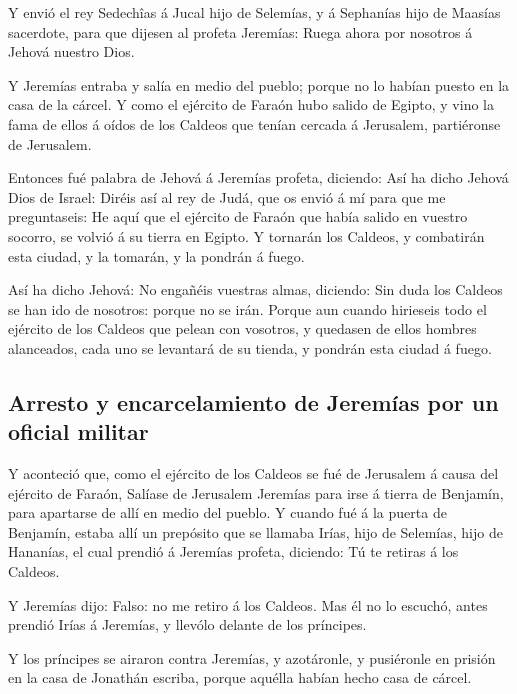  Y envió el rey Sedechîas á Jucal hijo de Selemías, y á
Sephanías hijo de Maasías sacerdote, para que dijesen al profeta
Jeremías: Ruega ahora por nosotros á Jehová nuestro Dios.

 Y Jeremías entraba y salía en medio del pueblo; porque no
lo habían puesto en la casa de la cárcel.  Y como el
ejército de Faraón hubo salido de Egipto, y vino la fama de ellos á
oídos de los Caldeos que tenían cercada á Jerusalem, partiéronse de
Jerusalem.

 Entonces fué palabra de Jehová á Jeremías profeta,
diciendo:  Así ha dicho Jehová Dios de Israel: Diréis así al
rey de Judá, que os envió á mí para que me preguntaseis: He aquí que el
ejército de Faraón que había salido en vuestro socorro, se volvió á su
tierra en Egipto.  Y tornarán los Caldeos, y combatirán esta
ciudad, y la tomarán, y la pondrán á fuego.

 Así ha dicho Jehová: No engañéis vuestras almas, diciendo:
Sin duda los Caldeos se han ido de nosotros: porque no se irán.
 Porque aun cuando hirieseis todo el ejército de los
Caldeos que pelean con vosotros, y quedasen de ellos hombres alanceados,
cada uno se levantará de su tienda, y pondrán esta ciudad á fuego.

\hypertarget{arresto-y-encarcelamiento-de-jeremuxedas-por-un-oficial-militar}{%
\subsection{Arresto y encarcelamiento de Jeremías por un oficial
militar}\label{arresto-y-encarcelamiento-de-jeremuxedas-por-un-oficial-militar}}

 Y aconteció que, como el ejército de los Caldeos se fué de
Jerusalem á causa del ejército de Faraón,  Salíase de
Jerusalem Jeremías para irse á tierra de Benjamín, para apartarse de
allí en medio del pueblo.  Y cuando fué á la puerta de
Benjamín, estaba allí un prepósito que se llamaba Irías, hijo de
Selemías, hijo de Hananías, el cual prendió á Jeremías profeta,
diciendo: Tú te retiras á los Caldeos.

 Y Jeremías dijo: Falso: no me retiro á los Caldeos. Mas él
no lo escuchó, antes prendió Irías á Jeremías, y llevólo delante de los
príncipes.

 Y los príncipes se airaron contra Jeremías, y azotáronle,
y pusiéronle en prisión en la casa de Jonathán escriba, porque aquélla
habían hecho casa de cárcel.


